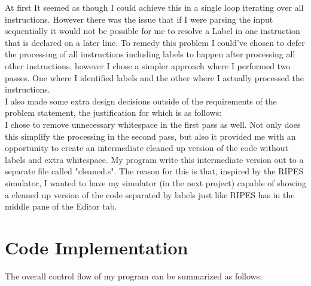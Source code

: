 \documentclass[12pt]{article}
\begin{document}
    At first It seemed as though I could achieve this in a single loop iterating over all instructions. However there was the issue that if I were parsing the input sequentially it would not be possible for me to resolve a Label in one instruction that is declared on a later line. To remedy this problem I could've chosen to defer the processing of all instructions including labels to happen after processing all other instructions, however I chose a simpler approach where I performed two passes. One where I identified labels and the other where I actually processed the instructions.
    \\

    I also made some extra design decisions outside of the requirements of the problem statement, the justification for which is as follows:
    \\

    I chose to remove unnecessary whitespace in the first pass as well. Not only does this simplify the processing in the second pass, but also it provided me with an opportunity to create an intermediate cleaned up version of the code without labels and extra whitespace. My program write this intermediate version out to a separate file called "cleaned.s". The reason for this is that, inspired by the RIPES simulator, I wanted to have my simulator (in the next project) capable of showing a cleaned up version of the code separated by labels just like RIPES has in the middle pane of the Editor tab.

    \section{Code Implementation}

    The overall control flow of my program can be summarized as follows:
    \\\\
\end{document}
